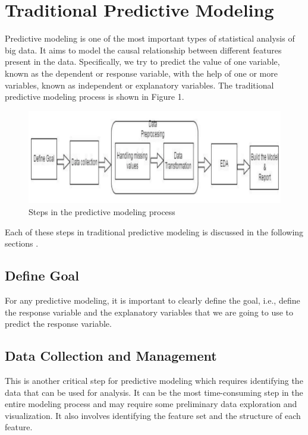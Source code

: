 \documentclass[sigconf]{acmart}
\begin{document}
\section{Traditional Predictive Modeling}

Predictive modeling is one of the most important types of statistical analysis of big data. It aims to model the causal relationship between different features present in the data. Specifically, we try to predict the value of one variable, known as the dependent or response variable, with the help of one or more variables, known as independent or explanatory variables. The traditional predictive modeling process is shown in Figure 1.

\begin{figure}[!ht]
  \centering\includegraphics[width=\columnwidth]{images/Fig1.png}
  \caption{Steps in the predictive modeling process \cite{part-reg}}
  \label{Figure 1}
\end{figure}

Each of these steps in traditional predictive modeling is discussed in the following sections \cite{part-reg}.

\subsection{Define Goal}
For any predictive modeling, it is important to clearly define the goal, i.e., define the response variable and the explanatory variables that we are going to use to predict the response variable.
\subsection{Data Collection and Management} 
This is another critical step for predictive modeling which requires identifying the data that can be used for analysis. It can be the most time-consuming step in the entire modeling process and may require some preliminary data exploration and visualization. It also involves identifying the feature set and the structure of each feature.
\end{document}
